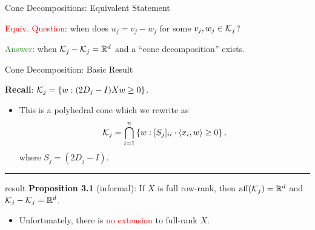 \documentclass[usenames,dvipsnames,mathserif,notheorems]{beamer}
\newcommand{\horizontalrule}{
	{
			\vspace{-0.5em}
			\center \rule{\textwidth}{0.1em}
			\vspace{-0.2em}
		}
}
\newcommand{\red}[1]{\textcolor{Red}{#1}}
\newcommand{\green}[1]{\textcolor{ForestGreen}{#1}}
\begin{document}
\begin{frame}{Cone Decompositions: Equivalent Statement}

	\red{Equiv. Question}: when does \( u_j = v_j - w_j \) for some \( v_j, w_j \in \mathcal{K}_j \)?

	\pause
	\vspace{1em}

	\green{Answer}: when \( \mathcal{K}_j - \mathcal{K}_j = \mathbb{R}^d \) and a ``cone decomposition'' exists.
	\pause

	\begin{figure}[]
		\centering
		
	\end{figure}

\end{frame}
\begin{frame}{Cone Decomposition: Basic Result}

	\textbf{Recall}: \( \mathcal{K}_j = \left\{w : (2 D_j - I) X w \geq 0\right\} \).
	\pause

	\begin{itemize}
		\item This is a polyhedral cone which we rewrite as
		      \[
			      \mathcal{K}_j = \bigcap_{i=1}^n \left\{w : [S_j]_{ii} \cdot \left\langle x_i, w\right\rangle \geq 0\right\},
		      \]
		      where \( S_j = (2D_j - I) \).
	\end{itemize}

	\pause
	\horizontalrule

	\begin{beamercolorbox}[wd=\textwidth,sep=1em]{result}
		\textbf{Proposition 3.1} (informal): If \( X \) is full row-rank,
		then \( \text{aff}(\mathcal{K}_j) = \mathbb{R}^d \) and
		\( \mathcal{K}_j - \mathcal{K}_j = \mathbb{R}^d \).
	\end{beamercolorbox}

	\vspace{1em}

	\pause
	\begin{itemize}
		\item Unfortunately, there is \red{no extension} to full-rank \( X \).
	\end{itemize}

\end{frame}
\end{document}
